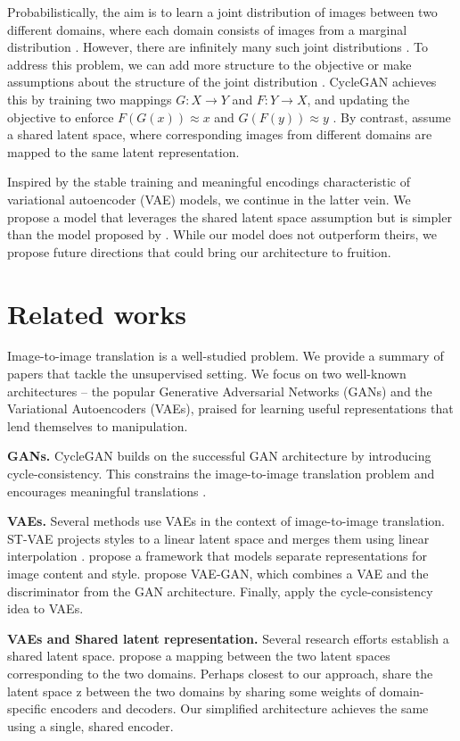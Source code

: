 \documentclass{article}
\begin{document}
Probabilistically, the aim is to learn a joint distribution of images between two different domains, where each domain consists of images from a marginal distribution \citep{liu}. However, there are infinitely many such joint distributions \citep{liu}. To address this problem, we can add more structure to the objective \citep{zhu} or make assumptions about the structure of the joint distribution \citep{liu}. CycleGAN achieves this by training two mappings $G: X \rightarrow Y$ and $F: Y \rightarrow X$, and updating the objective to enforce $F(G(x)) \approx x$ and $G(F(y)) \approx y$ \citep{zhu}. By contrast, \citet{liu} assume a shared latent space, where corresponding images from different domains are mapped to the same latent representation.

Inspired by the stable training and meaningful encodings characteristic of variational autoencoder (VAE) models, we continue in the latter vein. We propose a model that leverages the shared latent space assumption but is simpler than the model proposed by \citet{liu}. While our model does not outperform theirs, we propose future directions that could bring our architecture to fruition.

\section{Related works}
 Image-to-image translation is a well-studied problem. We provide a summary of papers that tackle the unsupervised setting. We focus on two well-known architectures – the popular Generative Adversarial Networks (GANs) and the Variational Autoencoders (VAEs), praised for learning useful representations that lend themselves to manipulation.

\textbf{GANs.} CycleGAN builds on the successful GAN architecture by introducing cycle-consistency. This constrains the image-to-image translation problem and encourages meaningful translations \citep{zhu}.

\textbf{VAEs.} Several methods use VAEs in the context of image-to-image translation. ST-VAE projects styles to a linear latent space and merges them using linear interpolation \citep{liu2}. \citet{kazemi} propose a framework that models separate representations for image content and style. \citet{larsen} propose VAE-GAN, which combines a VAE and the discriminator from the GAN architecture. Finally, \citet{jha} apply the cycle-consistency idea to VAEs.

\textbf{VAEs and Shared latent representation.} Several research efforts establish a shared latent space. \citet{zhao} propose a mapping between the two latent spaces corresponding to the two domains. Perhaps closest to our approach, \citet{liu} share the latent space z between the two domains by sharing some weights of domain-specific encoders and decoders. Our simplified architecture achieves the same using a single, shared encoder.
\end{document}
